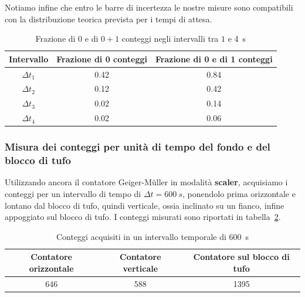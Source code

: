\documentclass[10pt,oneside,a4paper]{article}
\begin{document}
Notiamo infine che entro le barre di incertezza le nostre misure sono compatibili con la distribuzione teorica prevista per i tempi di attesa.

\begin{table}[ht]
\caption{Frazione di $0$ e di $0+1$ conteggi negli intervalli tra $1$ e \SI{4}{s}}
\label{tab:0e01conteggi}
\centering
\begin{tabular}{ccc}
\toprule
Intervallo & Frazione di 0 conteggi & Frazione di 0 e di 1 conteggi \\
\hline 
$\Delta t_1$ & 0.42  & 0.84 \\ 
$\Delta t_2$ & 0.12  & 0.42 \\
$\Delta t_3$ & 0.02  & 0.14 \\
$\Delta t_4$ & 0.02  & 0.06 \\
\bottomrule
\end{tabular}
\end{table}

\subsubsection{Misura dei conteggi per unità di tempo del fondo e del blocco di tufo}
\label{subsec:10minuti}
Utilizzando ancora il contatore Geiger-Müller in modalità \textbf{scaler}, acquisiamo i conteggi per un intervallo di tempo di $\Delta t = \SI{600}{s}$, ponendolo prima orizzontale e lontano dal blocco di tufo, quindi verticale, ossia inclinato su un fianco, infine appoggiato sul blocco di tufo. I conteggi misurati sono riportati in tabella~\ref{tab:conteggi600s}.

\begin{table}[ht]
\caption{Conteggi acquisiti in un intervallo temporale di \SI{600}{s}}
\label{tab:conteggi600s}
\centering
\begin{tabular}{ccc}
\toprule
Contatore orizzontale & Contatore verticale & Contatore sul blocco di tufo \\
\hline 
646 & 588 & 1395 \\
\bottomrule
\end{tabular}
\end{table}
\end{document}
